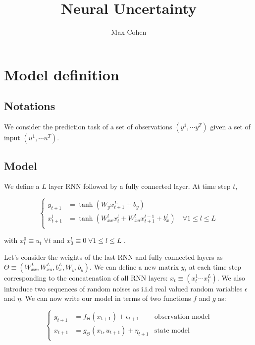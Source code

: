 \documentclass[10pt,a4paper]{report}
\begin{document}
\title{Neural Uncertainty}
\author{Max Cohen}
\maketitle

\chapter{Model definition}
\section{Notations}
We consider the prediction task of a set of observations $(y^1, \cdots y^T)$ given a set of input $(u^1, \cdots u^T)$.

\section{Model}
We define a $L$ layer RNN followed by a fully connected layer. At time step $t$,

\begin{equation*}
    \left\{
    \begin{aligned}
        y_{t+1}   & = \tanh(W_y x_{t+1}^L + b_y)                                                               \\
        x_{t+1}^l & = \tanh(W_{xx}^l x^{l}_{t} + W_{xu}^l x^{l-1}_{t+1} + b_x^l) \quad \forall 1 \leq l \leq L \\
    \end{aligned}
    \right.
\end{equation*}

with $x_{t}^0 \equiv u_{t} \; \forall t$ and $x_{0}^l \equiv 0 \; \forall 1 \leq l \leq L$ .

Let's consider the weights of the last RNN and fully connected layers as $\Theta \equiv (W_{xx}^L, W_{xu}^L, b_x^L, W_y, b_y)$. We can define a new matrix $y_t$ at each time step corresponding to the concatenation of all RNN layers: $x_t \equiv (x_t^1 \cdots x_t^L)$. We also introduce two sequences of random noises as i.i.d real valued random variables $\epsilon$ and $\eta$. We can now write our model in terms of two functions $f$ and $g$ as:

\begin{equation}
    \left\{
    \begin{aligned}
        y_{t+1} & = f_\Theta(x_{t+1}) + \epsilon_{t+1}    & \text{observation model} \\
        x_{t+1} & = g_\Theta(x_{t}, u_{t+1}) + \eta_{t+1} & \text{state model}       \\
    \end{aligned}
    \right.
\end{equation}
\end{document}
